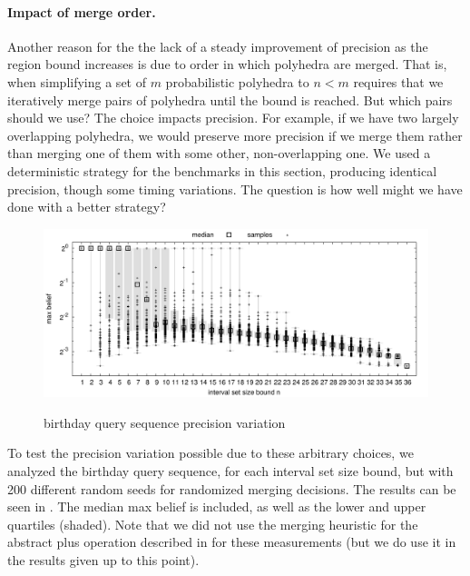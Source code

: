 \paragraph*{Impact of merge order.} 
Another reason for the the lack of a steady
improvement of precision as the region bound increases is due to order
in which polyhedra are merged.  That is, when simplifying a set of $m$
probabilistic polyhedra to $ n < m $ requires that we iteratively
merge pairs of polyhedra until the bound is reached.  But which pairs
should we use?  The choice impacts precision.  For example, if we have
two largely overlapping polyhedra, we would preserve more precision if
we merge them rather than merging one of them with some other,
non-overlapping one.  We used a deterministic strategy for the
benchmarks in this section, producing identical precision, though some
timing variations.  The question is how well might we have done with a
better strategy?

\begin{figure}[t!]
\scriptsize
\centering
\includegraphics[width=12.5cm]{figures/plot_random_box.pdf} \\
\caption{birthday query sequence precision variation}
\label{fig:random_box}
\end{figure}

To test the precision variation possible due to these arbitrary
choices, we analyzed the birthday query sequence, for each interval
set size bound, but with 200 different random seeds for randomized
merging decisions. The results can be seen in
. The median max belief is included, as well as
the lower and upper quartiles (shaded). Note that we did not use the
merging heuristic for the abstract plus operation described in
 for these measurements (but we do use it in the
results given up to this point).

